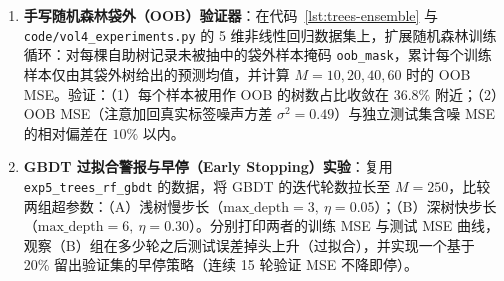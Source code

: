 
\begin{enumerate}[label=\textbf{5.\arabic*}, resume]
  \item \textbf{手写随机森林袋外（OOB）验证器}：在代码~\ref{lst:trees-ensemble} 与 \texttt{code/\allowbreak vol4\_experiments.py} 的 5 维非线性回归数据集上，扩展随机森林训练循环：对每棵自助树记录未被抽中的袋外样本掩码 \texttt{oob\_mask}，累计每个训练样本仅由其袋外树给出的预测均值，并计算 $M = 10, 20, 40, 60$ 时的 OOB MSE。验证：（1）每个样本被用作 OOB 的树数占比收敛在 $36.8\%$ 附近；（2）OOB MSE（注意加回真实标签噪声方差 $\sigma^2 = 0.49$）与独立测试集含噪 MSE 的相对偏差在 $10\%$ 以内。

  \item \textbf{GBDT 过拟合警报与早停（Early Stopping）实验}：复用 \texttt{exp5\_trees\_rf\_gbdt} 的数据，将 GBDT 的迭代轮数拉长至 $M = 250$，比较两组超参数：（A）浅树慢步长（$\text{max\_depth}=3,\ \eta=0.05$）；（B）深树快步长（$\text{max\_depth}=6,\ \eta=0.30$）。分别打印两者的训练 MSE 与测试 MSE 曲线，观察（B）组在多少轮之后测试误差掉头上升（过拟合），并实现一个基于 20\% 留出验证集的早停策略（连续 15 轮验证 MSE 不降即停）。
\end{enumerate}
